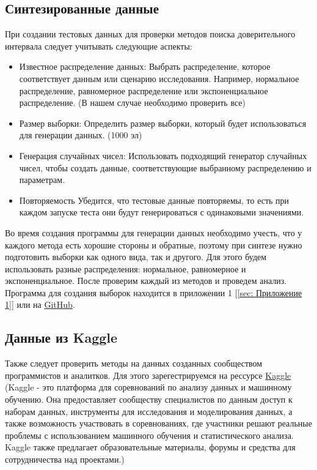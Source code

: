 \documentclass[specialist,
               substylefile = spbu_report.rtx,
               subf,href,colorlinks=true, 12pt]{disser}
\begin{document}
    \subsection{Синтезированные данные}
        При создании тестовых данных для проверки методов поиска доверительного интервала следует учитывать следующие аспекты:
        \begin{itemize}
            \item    Известное распределение данных: 
            Выбрать распределение, которое соответствует данным или сценарию исследования. Например, нормальное распределение, равномерное распределение или экспоненциальное распределение.
            (В нашем случае необходимо проверить все)
            \item 	 Размер выборки: 
            Определить размер выборки, который будет использоваться для генерации данных. (1000 эл)
            \item 	 Генерация случайных чисел:
            Использовать подходящий генератор случайных чисел, чтобы создать данные, соответствующие выбранному распределению и параметрам. 
            \item 	 Повторяемость
            Убедится, что тестовые данные повторяемы, то есть при каждом запуске теста они будут генерироваться с одинаковыми значениями.
        \end{itemize}  
        
        Во время создания программы для генерации данных необходимо учесть, что у каждого метода есть хорошие стороны и обратные, поэтому при синтезе нужно подготовить выборки как одного вида, так и другого. Для этого будем использовать разные распределения: нормальное, равномерное и экспоненциальное. После проверим каждый из методов и проведем анализ.
        Программа для создания выборок находится в приложении 1 [\ref{sec: Приложение 1}] или на \href{https://github.com/krivonosovti/QuantileCIComparison/blob/main/DataFactory.py}{GitHub}.
    \subsection{Данные из Kaggle}
        Также следует проверить методы на данных созданных сообществом программистов и аналитков. Для этого зарегестрируемся на рессурсе \href{https://www.kaggle.com}{Kaggle} (Kaggle - это платформа для соревнований по анализу данных и машинному обучению. Она предоставляет сообществу специалистов по данным доступ к наборам данных, инструменты для исследования и моделирования данных, а также возможность участвовать в соревнованиях, где участники решают реальные проблемы с использованием машинного обучения и статистического анализа. Kaggle также предлагает образовательные материалы, форумы и средства для сотрудничества над проектами.)
\end{document}
